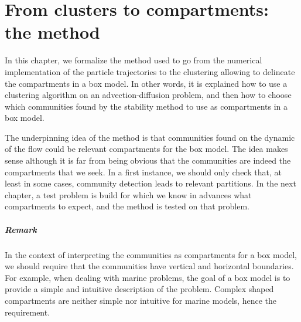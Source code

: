 \chapter{From clusters to compartments: the method} \label{chap:method}
In this chapter, we formalize the method used to go from the numerical implementation of the particle trajectories to the clustering allowing to delineate the compartments in a box model. In other words, it is explained how to use a clustering algorithm on an advection-diffusion problem, and then how to choose which communities found by the stability method to use as compartments in a box model. 

The underpinning idea of the method is that communities found on the dynamic of the flow could be relevant compartments for the box model. The idea makes sense although it is far from being obvious that the communities are indeed the compartments that we seek. In a first instance, we should only check that, at least in some cases, community detection leads to relevant partitions. In the next chapter, a test problem is build for which we know in advances what compartments to expect, and the method is tested on that problem.

\paragraph{Remark} \label{remark:straightboundaries} In the context of interpreting the communities as compartments for a box model, we should require that the communities have vertical and horizontal boundaries. For example, when dealing with marine problems, the goal of a box model is to provide a simple and intuitive description of the problem. Complex shaped compartments are neither simple nor intuitive for marine models, hence the requirement.


% 
